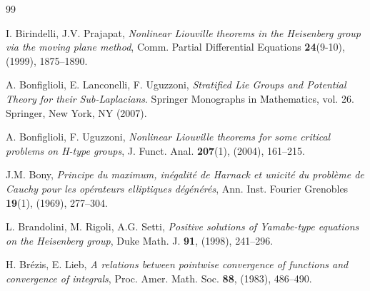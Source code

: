 \documentclass[11pt]{amsart}
\numberwithin{equation}{section} %
\theoremstyle{definition}
\begin{document}
\begin{thebibliography}{99}
	
	I. Birindelli, J.V. Prajapat, 
	{\em Nonlinear Liouville theorems in the Heisenberg group via the moving plane method},	
	Comm. Partial Differential Equations {\bf 24}(9-10), (1999), 1875--1890.
	
	
	
	A. Bonfiglioli, E. Lanconelli, F. Uguzzoni, 
	{\em Stratified Lie Groups and Potential Theory for their
		Sub-Laplacians}. Springer Monographs in Mathematics, vol. 26. Springer, New York, NY (2007).
	
	A. Bonfiglioli, F. Uguzzoni,
	{\em Nonlinear Liouville theorems for some critical
		problems on H-type groups},
	J. Funct. Anal. {\bf 207}(1), (2004), 161--215.
	
	J.M. Bony,
	{\em Principe du maximum, in\'{e}galit\'{e} de Harnack et unicit\'{e} du probl\`{e}me de Cauchy pour les op\'{e}rateurs elliptiques d\'{e}g\'{e}n\'{e}r\'{e}s}, 
	Ann. Inst. Fourier Grenobles {\bf 19}(1), (1969), 277--304.
	
	
	
	
	L. Brandolini, M. Rigoli, A.G. Setti, 
	{\em Positive solutions of Yamabe-type equations on the Heisenberg group},
	Duke Math. J. {\bf 91}, (1998), 241--296.
	
	
	H. Br\'{e}zis, E. Lieb, 
	{\em A relations between pointwise convergence of functions and convergence of integrals}, 
	Proc. Amer. Math. Soc. {\bf 88}, (1983), 486--490.
	

\end{thebibliography}
\end{document}
